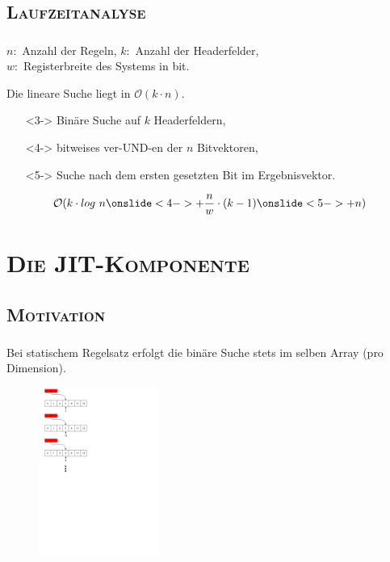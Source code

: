 \documentclass[xcolor=x11names,compress]{beamer}
\renewcommand{\(}{\begin{columns}}
\renewcommand{\)}{\end{columns}}
\newcommand{\<}[1]{\begin{column}{#1}}
\renewcommand{\>}{\end{column}}
\begin{document}
\subsection{\scshape Laufzeitanalyse}
\begin{frame}
  \frametitle{\insertsubsection}
  $n:$ Anzahl der Regeln, $k:$ Anzahl der Headerfelder,\\$w:$ Registerbreite des Systems in bit.
  \pause
  \begin{tcolorbox}[colback=red!5!white,colframe=red!75!black,title=Erinnerung: Lineare Suche,drop fuzzy shadow]
  Die lineare Suche liegt in $\mathcal O(k \cdot n)$.
  \end{tcolorbox}
  \pause
  \begin{tcolorbox}[colback=yellow!5!white,colframe=yellow!75!black,title=Bitvector-Algorithmus,drop fuzzy shadow]
  \begin{itemize}[leftmargin=0cm]
    \item[]<3-> Binäre Suche auf $k$ Headerfeldern,
    \item[]<4-> bitweises ver-UND-en der $n$ Bitvektoren,
    \item[]<5-> Suche nach dem ersten gesetzten Bit im Ergebnisvektor.
  \end{itemize}
  \centering
  \begin{equation*}
  \mathcal O(k \cdot log\ n \onslide<4->{+ \frac{n}{w} \cdot (k - 1)} \onslide<5->{ + n})
  \end{equation*}
  \end{tcolorbox}
\end{frame}

\section{\scshape Die JIT-Komponente}
\subsection{\scshape Motivation}
\begin{frame}
  \frametitle{\insertsubsection}
  Bei statischem Regelsatz erfolgt die binäre Suche stets im selben Array (pro Dimension).\\
  \begin{figure}
  \centering
  \includegraphics[height=5.5cm]{figures/matching_process}
  \end{figure}
\end{frame}
\end{document}
